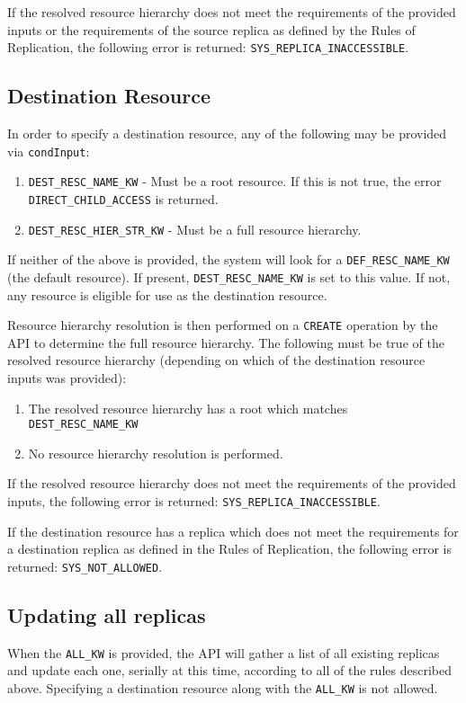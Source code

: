 \documentclass{irodsugm}
\begin{document}
If the resolved resource hierarchy does not meet the requirements of the provided inputs or the requirements of the source replica as defined by the Rules of Replication, the following error is returned: \texttt{SYS\_REPLICA\_INACCESSIBLE}.

\subsection*{Destination Resource}
In order to specify a destination resource, any of the following may be provided via \texttt{condInput}:

\begin{enumerate}
    \item \texttt{DEST\_RESC\_NAME\_KW} - Must be a root resource. If this is not true, the error \texttt{DIRECT\_CHILD\_ACCESS} is returned.
    \item \texttt{DEST\_RESC\_HIER\_STR\_KW} - Must be a full resource hierarchy.
\end{enumerate}

If neither of the above is provided, the system will look for a \texttt{DEF\_RESC\_NAME\_KW} (the default resource). If present, \texttt{DEST\_RESC\_NAME\_KW} is set to this value. If not, any resource is eligible for use as the destination resource.

Resource hierarchy resolution is then performed on a \texttt{CREATE} operation by the API to determine the full resource hierarchy. The following must be true of the resolved resource hierarchy (depending on which of the destination resource inputs was provided):

\begin{enumerate}
    \item The resolved resource hierarchy has a root which matches \texttt{DEST\_RESC\_NAME\_KW}
    \item No resource hierarchy resolution is performed.
\end{enumerate}

If the resolved resource hierarchy does not meet the requirements of the provided inputs, the following error is returned: \texttt{SYS\_REPLICA\_INACCESSIBLE}.

If the destination resource has a replica which does not meet the requirements for a destination replica as defined in the Rules of Replication, the following error is returned: \texttt{SYS\_NOT\_ALLOWED}.

\subsection*{Updating all replicas}
When the \texttt{ALL\_KW} is provided, the API will gather a list of all existing replicas and update each one, serially at this time, according to all of the rules described above. Specifying a destination resource along with the \texttt{ALL\_KW} is not allowed.
\end{document}
